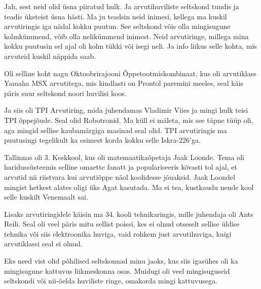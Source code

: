 
Jah, sest neid olid üsna piiratud hulk. Ja arvutihuviliste seltskond 
tundis ja teadis üksteist üsna hästi. Ma 
ju teadsin neid inimesi, kellega ma kuskil arvutiringis iga nädal kokku puutun. 
See seltskond võis olla mingisugune kolmkümmend, võib olla nelikümmend inimest. 
Neid arvutiringe,  millega mina kokku puutusin sel ajal oli kolm tükki 
või isegi neli. Ja info liikus selle kohta, mis arvuteid kuskil näppida saab.

Oli selline koht nagu Oktoobrirajooni Õppetootmiskombinaat, kus oli arvutiklass Yamaha 
MSX arvutitega, mis kindlasti on Prontol 
paremini meeles, seal käis päris suur seltskond noori huvilisi koos. 

Ja siis oli TPI Arvutiring, mida juhendamas 
Vladimir Viies ja mingi hulk teisi TPI õppejõude. Seal 
olid Robotronid. Ma küll ei mäleta, mis see täpne tüüp 
oli, aga mingid  sellise kaubamärgiga masinad seal olid. TPI arvutiringis 
ma puutusingi tegelikult ka esimest korda  kokku selle 
Iskra-226'ga.

Tallinnas oli  3. Keskkool, 
kus oli  matemaatikaõpetaja  Jaak Loonde. Tema oli haridussüsteemis selline omaette fanatt ja  populariseeris 
kõvasti tol ajal, et arvutid nii riistvara kui arvutiõppe näol koolidesse 
jõuaksid. Jaak Loondel  mingist hetkest alates oligi üks 
Agat kasutada. Ma ei tea, kustkaudu nende kool selle 
kuskilt Venemaalt sai. 

Lisaks arvutiringidele käisin ma  34. kooli 
tehnikaringis, mille juhendaja oli Ants Reili. Seal oli veel
päris mitu sellist poissi, kes ei olnud otseselt sellise üldise tehnika 
või siis elektroonika huviga, vaid rohkem  just arvutihuviga, kuigi arvutiklassi
seal ei olnud.

Eks need vist olid põhilised seltskonnad minu jaoks, kus siis igasühes oli  ka 
mingisugune kattuvus liikmeskonna osas. Muidugi oli 
veel mingisuguseid seltskondi või nii-öelda  huviliste ringe, omakorda mingi kattuvusega.


